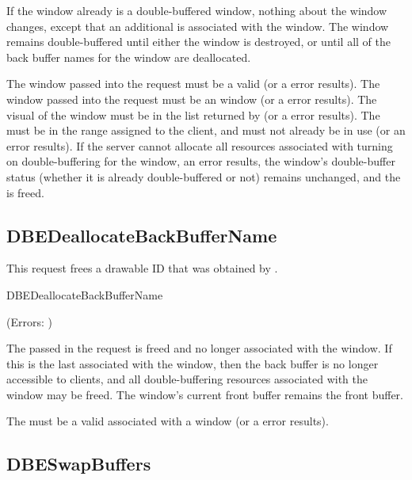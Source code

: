 If the window already is a double-buffered window, nothing about the
window changes, except that an additional 
is associated with the window.  The window remains double-buffered
until either the window is destroyed, or until all of the back buffer
names for the window are deallocated.

The window passed into the request must be a valid 
(or a  error results).
The window passed into the request must
be an  window (or a  error results).
The visual of the window must be in the list returned by
 (or a  error results).
The  must be in the range assigned to the
client, and must not already be in use (or an 
error results).
If the server cannot allocate all resources associated with turning on
double-buffering for the window, an  error results, the
window's double-buffer status (whether it is already double-buffered or not)
remains unchanged, and the  is freed.

\subsection{DBEDeallocateBackBufferName}

This request frees a drawable ID that was obtained by
.

\begin{arequest}{DBEDeallocateBackBufferName}
\end{arequest}

                (Errors: )

The  passed in the request is freed and no
longer associated with the window.  If this is the last
 associated with the window, then the back
buffer is no longer accessible to clients, and all double-buffering
resources associated with the window may be freed.  The window's
current front buffer remains the front buffer.

The  must be a valid 
associated with a window (or a  error results).

\subsection{DBESwapBuffers}

